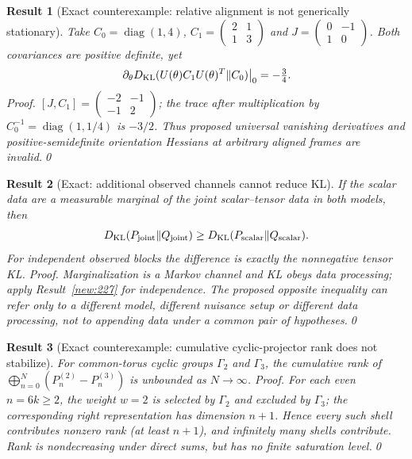 \documentclass[aps,prd,onecolumn,notitlepage,groupedaddress,11pt]{revtex4-2}
\newtheorem{result}{Result}
\begin{document}
\begin{result}[\textsf{Exact counterexample}: relative alignment is not generically stationary]\label{new:229}
Take $C_0=\operatorname{diag}(1,4)$, $C_1=\left(\begin{smallmatrix}2&1\\1&3\end{smallmatrix}\right)$ and $J=\left(\begin{smallmatrix}0&-1\\1&0\end{smallmatrix}\right)$. Both covariances are positive definite, yet
\begin{equation}\label{eq:post229}
\left.\partial_\theta D_{\rm KL}(U(\theta)C_1U(\theta)^T\Vert C_0)\right|_{0}=-\tfrac34.
\end{equation}
\textit{Proof.} $[J,C_1]=\left(\begin{smallmatrix}-2&-1\\-1&2\end{smallmatrix}\right)$; the trace after multiplication by $C_0^{-1}=\operatorname{diag}(1,1/4)$ is $-3/2$. Thus proposed universal vanishing derivatives and positive-semidefinite orientation Hessians at arbitrary aligned frames are invalid.\qed
\end{result}

\begin{result}[\textsf{Exact}: additional observed channels cannot reduce KL]\label{new:230}
If the scalar data are a measurable marginal of the joint scalar--tensor data in both models, then
\begin{equation}\label{eq:post230}
D_{\rm KL}(P_{\rm joint}\Vert Q_{\rm joint})\ge
D_{\rm KL}(P_{\rm scalar}\Vert Q_{\rm scalar}).
\end{equation}
For independent observed blocks the difference is exactly the nonnegative tensor KL. \textit{Proof.} Marginalization is a Markov channel and KL obeys data processing; apply Result~\ref{new:227} for independence. The proposed opposite inequality can refer only to a \emph{different} model, different nuisance setup or different data processing, not to appending data under a common pair of hypotheses.\qed
\end{result}

\begin{result}[\textsf{Exact counterexample}: cumulative cyclic-projector rank does not stabilize]\label{new:231}
For common-torus cyclic groups $\Gamma_2$ and $\Gamma_3$, the cumulative rank of $\bigoplus_{n=0}^N(P_n^{(2)}-P_n^{(3)})$ is unbounded as $N\to\infty$. \textit{Proof.} For each even $n=6k\ge2$, the weight $w=2$ is selected by $\Gamma_2$ and excluded by $\Gamma_3$; the corresponding right representation has dimension $n+1$. Hence every such shell contributes nonzero rank (at least $n+1$), and infinitely many shells contribute. Rank is nondecreasing under direct sums, but has no finite saturation level.\qed
\end{result}
\end{document}
